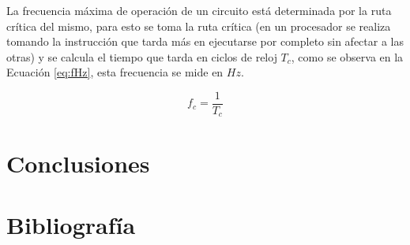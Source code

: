 \documentclass[journal]{IEEEtran}
\begin{document}
	La frecuencia máxima de operación de un circuito está determinada por la ruta crítica del mismo, para esto se toma la ruta crítica (en un procesador se realiza tomando la instrucción que tarda más en ejecutarse por completo sin afectar a las otras) y se calcula el tiempo que tarda en ciclos de reloj $T_{c}$, como se observa en la Ecuación \ref{eq:fHz}, esta frecuencia se mide en $Hz$.
	
	\begin{equation}
		f_{c} = \dfrac{1}{T_{c}}
		\label{eq:fHz}
	\end{equation}
	
	\section{Conclusiones}
	
	\section{Bibliografía}
	
	
	
	
\end{document}
